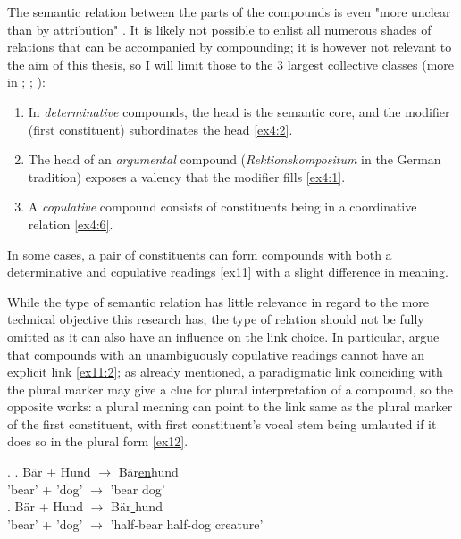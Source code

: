 \documentclass[11pt]{article}
\begin{document}
The semantic relation between the parts of the compounds is even "more unclear than by attribution" \cite[220]{eisenberg2016grundriss}. It is likely not possible to enlist all numerous shades of relations that can be accompanied by compounding; it is however not relevant to the aim of this thesis, so I will limit those to the 3 largest collective classes (more in \citealt[219-223]{eisenberg2016grundriss}; \citealt[224-225]{Schafer2018:a}; \citealt{Schlucker2022}):

\begin{enumerate}

    \item In \textit{determinative} compounds, the head is the semantic core, and the modifier (first constituent) subordinates the head \ref{ex4:2}. 

    \item The head of an \textit{argumental} compound (\textit{Rektionskompositum} in the German tradition) exposes a valency that the modifier fills \ref{ex4:1}.

    \item A \textit{copulative} compound consists of constituents being in a coordinative relation \ref{ex4:6}.
    
\end{enumerate}

In some cases, a pair of constituents can form compounds with both a determinative and copulative readings \ref{ex11} with a slight difference in meaning.

While the type of semantic relation has little relevance in regard to the more technical objective this research has, the type of relation should not be fully omitted as it can also have an influence on the link choice. In particular, \citet{NeefBorgwaldt+2012+27+56} argue that compounds with an unambiguously copulative readings cannot have an explicit link \ref{ex11:2}; as already mentioned, a paradigmatic link coinciding with the plural marker may give a clue for plural interpretation of a compound, so the opposite works: a plural meaning can point to the link same as the plural marker of the first constituent, with first constituent's vocal stem being umlauted if it does so in the plural form \ref{ex12}.

\ex. \label{ex11}
\ag. \label{ex11:1}B{\"a}r + Hund {$\rightarrow$} B{\"a}r\underline{en}hund \\
'bear' + 'dog' {$\rightarrow$} {'bear dog'} \\
\bg. \label{ex11:2}B{\"a}r + Hund {$\rightarrow$} B{\"a}r\underline{ }hund \\ 'bear' + 'dog' {$\rightarrow$} {'half-bear half-dog creature'} \\
\end{document}

